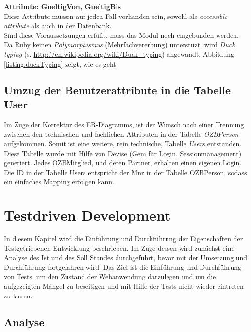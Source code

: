 \documentclass[12pt,             %
               a4paper,          %
               listof=totoc,     %
               index=totoc,      %
               bibliography=totoc,%
               oneside,         %
               BCOR1cm,          %
               english   %
               ]{scrbook}
\begin{document}
\textbf{Attribute: GueltigVon, GueltigBis}\\
Diese Attribute müssen auf jeden Fall vorhanden sein, sowohl als \textit{accessible attribute} als auch in der Datenbank. \\

Sind diese Voraussetzungen erfüllt, muss das Modul noch eingebunden werden. Da Ruby keinen \textit{Polymorphismus} (Mehrfachvererbung) unterstüzt, wird \textit{Duck typing} (s. \url{http://en.wikipedia.org/wiki/Duck_typing}) angewandt. Abbildung \vref{listing:duckTyping} zeigt, wie es geht.

\label{listing:duckTyping}


\section{Umzug der Benutzerattribute in die Tabelle User}
Im Zuge der Korrektur des ER-Diagramms, ist der Wunsch nach einer Trennung zwischen den technischen und fachlichen Attributen in der Tabelle \textit{OZBPerson} aufgekommen. Somit ist eine weitere, rein technische, Tabelle \textit{Users} entstanden. Diese Tabelle wurde mit Hilfe von Devise (Gem für Login, Sessionmanagement) generiert. Jedes OZBMitglied, und deren Partner, erhalten einen eigenen Login. Die ID in der Tabelle Users entspricht der Mnr in der Tabelle OZBPerson, sodass ein einfaches Mapping erfolgen kann.

\clearpage
\chapter{Testdriven Development}
In diesem Kapitel wird die Einführung und Durchführung der Eigenschaften der Testgetriebenen Entwicklung beschrieben. Im Zuge dessen wird zunächst eine Analyse des Ist und des Soll Standes durchgeführt, bevor mit der Umsetzung und Durchführung fortgefahren wird. Das Ziel ist die Einführung und Durchführung von Tests, um den Zustand der Webanwendung darzulegen und um die aufgezeigten Mängel zu beseitigen und mit Hilfe der Tests nicht wieder eintreten zu lassen.    

\section{Analyse}
\end{document}
